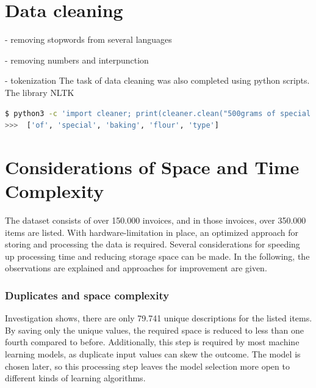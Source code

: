 	
	
	

	
	\section{Data cleaning}
    - removing stopwords from several languages
        
    - removing numbers and interpunction
    
    - tokenization
	The task of data cleaning was also completed using python scripts. The library \ac{NLTK}
	
	\begin{lstlisting}[language=sh]
$ python3 -c 'import cleaner; print(cleaner.clean("500grams of special baking flour type 504"))' 
>>>  ['of', 'special', 'baking', 'flour', 'type']
	\end{lstlisting}
	 
	\section{Considerations of Space and Time Complexity}
	The dataset consists of over 150.000 invoices, and in those invoices, over 350.000 items are listed. 
	With hardware-limitation in place, an optimized approach for storing and processing the data is required. 
	Several considerations for speeding up processing time and reducing storage space can be made. 
	In the following, the observations are explained and approaches for improvement are given.

		\subsubsection{Duplicates and space complexity}
		Investigation shows, there are only 79.741 unique descriptions for the listed items. By saving only the unique values, the required space is reduced to less than one fourth compared to before. Additionally, this step is required by most machine learning models, as duplicate input values can skew the outcome. The model is chosen later, so this processing step leaves the model selection more open to different kinds of learning algorithms.
		
